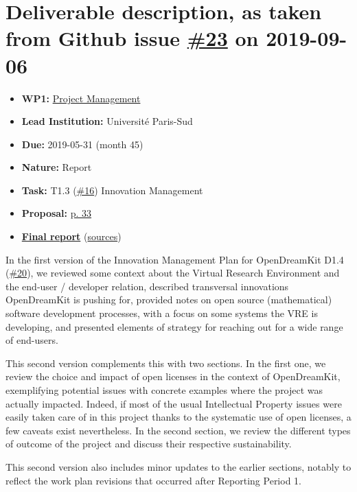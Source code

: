 \hypertarget{deliverable-description-as-taken-from-github-issue-23-on-2019-09-06}{%
\section*{\texorpdfstring{Deliverable description, as taken from Github
issue
\href{https://github.com/OpenDreamKit/OpenDreamKit/issues/23}{\#23} on
2019-09-06}{Deliverable description, as taken from Github issue \#23 on 2019-09-06}}\label{deliverable-description-as-taken-from-github-issue-23-on-2019-09-06}}

\begin{itemize}
\tightlist
\item
  \textbf{WP1:}
  \href{https://github.com/OpenDreamKit/OpenDreamKit/tree/master/WP1}{Project
  Management}
\item
  \textbf{Lead Institution:} Université Paris-Sud
\item
  \textbf{Due:} 2019-05-31 (month 45)
\item
  \textbf{Nature:} Report
\item
  \textbf{Task:} T1.3
  (\href{https://github.com/OpenDreamKit/OpenDreamKit/issues/16}{\#16})
  Innovation Management
\item
  \textbf{Proposal:}
  \href{https://github.com/OpenDreamKit/OpenDreamKit/raw/master/Proposal/proposal-www.pdf}{p.
  33}
\item
  \textbf{\href{https://github.com/OpenDreamKit/OpenDreamKit/raw/master/WP1/D1.7/report-final.pdf}{Final
  report}}
  (\href{https://github.com/OpenDreamKit/OpenDreamKit/raw/master/WP1/D1.7/}{sources})
\end{itemize}

In the first version of the Innovation Management Plan for OpenDreamKit
D1.4
(\href{https://github.com/OpenDreamKit/OpenDreamKit/issues/20}{\#20}),
we reviewed some context about the Virtual Research Environment and the
end-user / developer relation, described transversal innovations
OpenDreamKit is pushing for, provided notes on open source
(mathematical) software development processes, with a focus on some
systems the VRE is developing, and presented elements of strategy for
reaching out for a wide range of end-users.

This second version complements this with two sections. In the first
one, we review the choice and impact of open licenses in the context of
OpenDreamKit, exemplifying potential issues with concrete examples where
the project was actually impacted. Indeed, if most of the usual
Intellectual Property issues were easily taken care of in this project
thanks to the systematic use of open licenses, a few caveats exist
nevertheless. In the second section, we review the different types of
outcome of the project and discuss their respective sustainability.

This second version also includes minor updates to the earlier sections,
notably to reflect the work plan revisions that occurred after Reporting
Period 1.
